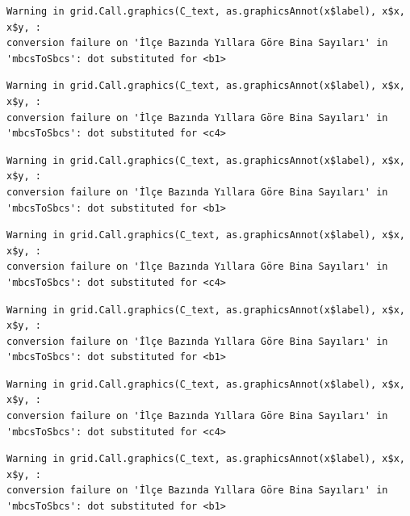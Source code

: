 \documentclass[
  11pt,
  a4paper,
  DIV=11,
  numbers=noendperiod]{scrartcl}
\begin{document}
\begin{verbatim}
Warning in grid.Call.graphics(C_text, as.graphicsAnnot(x$label), x$x, x$y, :
conversion failure on 'İlçe Bazında Yıllara Göre Bina Sayıları' in
'mbcsToSbcs': dot substituted for <b1>
\end{verbatim}

\begin{verbatim}
Warning in grid.Call.graphics(C_text, as.graphicsAnnot(x$label), x$x, x$y, :
conversion failure on 'İlçe Bazında Yıllara Göre Bina Sayıları' in
'mbcsToSbcs': dot substituted for <c4>
\end{verbatim}

\begin{verbatim}
Warning in grid.Call.graphics(C_text, as.graphicsAnnot(x$label), x$x, x$y, :
conversion failure on 'İlçe Bazında Yıllara Göre Bina Sayıları' in
'mbcsToSbcs': dot substituted for <b1>
\end{verbatim}

\begin{verbatim}
Warning in grid.Call.graphics(C_text, as.graphicsAnnot(x$label), x$x, x$y, :
conversion failure on 'İlçe Bazında Yıllara Göre Bina Sayıları' in
'mbcsToSbcs': dot substituted for <c4>
\end{verbatim}

\begin{verbatim}
Warning in grid.Call.graphics(C_text, as.graphicsAnnot(x$label), x$x, x$y, :
conversion failure on 'İlçe Bazında Yıllara Göre Bina Sayıları' in
'mbcsToSbcs': dot substituted for <b1>
\end{verbatim}

\begin{verbatim}
Warning in grid.Call.graphics(C_text, as.graphicsAnnot(x$label), x$x, x$y, :
conversion failure on 'İlçe Bazında Yıllara Göre Bina Sayıları' in
'mbcsToSbcs': dot substituted for <c4>
\end{verbatim}

\begin{verbatim}
Warning in grid.Call.graphics(C_text, as.graphicsAnnot(x$label), x$x, x$y, :
conversion failure on 'İlçe Bazında Yıllara Göre Bina Sayıları' in
'mbcsToSbcs': dot substituted for <b1>
\end{verbatim}
\end{document}
